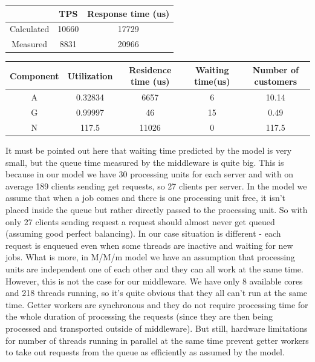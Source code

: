 \documentclass[11pt]{article}
\begin{document}
{\small
\begin{center}
\begin{tabular}{|c|c|c|}
\hline & TPS & Response time (us) \\
\hline Calculated &10660 & 17729 \\
\hline Measured & 8831 & 20966 \\
\hline
\end{tabular}
\end{center}

\begin{center}
\begin{tabular}{|c|c|c|c|c|}
\hline Component & Utilization & Residence time (us) & Waiting time(us) & Number of customers\\
\hline A &0.32834  &  6657 & 6 & 10.14 \\
\hline G & 0.99997 & 46  & 15 & 0.49 \\
\hline N & 117.5  & 11026 & 0 & 117.5 \\
\hline
\end{tabular}
\end{center}
}

It must be pointed out here that waiting time predicted by the model is very small, but the queue time measured by the middleware is quite big.
This is because in our model we have 30 processing units for each server and with on average 189 clients sending get requests, so 27 clients per server. In the model we assume that when a job comes and there is one processing unit free, it isn't placed inside the queue but rather directly passed to the processing unit. So with only 27 clients sending request a request should almost never get queued (assuming good perfect balancing). In our case situation is different - each request is enqueued even when some threads are inactive and waiting for new jobs. What is more, in M/M/m model we have an assumption that processing units are independent one of each other and they can all work at the same time. However, this is not the case for our middleware. We have only 8 available cores and 218 threads running, so it's quite obvious that they all can't run at the same time. Getter workers are synchronous and they do not require processing time for the whole duration of processing the requests (since they are then being processed and transported outside of middleware). But still, hardware limitations for number of threads running in parallel at the same time prevent getter workers to take out requests from the queue as efficiently as assumed by the model.
\end{document}
